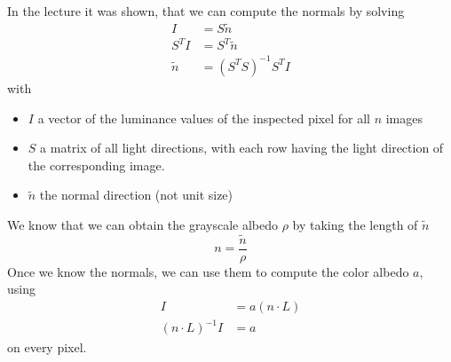 \documentclass{paper}
\begin{document}
In the lecture it was shown, that we can compute the normals by solving
\begin{align*}
	 I &= S\tilde{n} \\
	 S^TI &= S^T\tilde{n} \\
	 \tilde{n} &= (S^TS)^{-1}S^TI
\end{align*}
with 
\begin{itemize}
	\item $I$ a vector of the luminance values of the 
	inspected pixel for all $n$ images
	\item $S$ a matrix of all light directions, with each row
	having the light direction of the corresponding image.
	\item $\tilde{n}$ the normal direction (not unit size)
\end{itemize}
We know that we can obtain the grayscale albedo $\rho$ by taking the length of $\tilde{n}$
\begin{equation}
	n = \frac{\tilde{n}}{\rho}
\end{equation}
Once we know the normals, we can use them to compute the color albedo $a$, using
\begin{align*}
	I &= a(n \cdot L) \\
	(n \cdot L)^{-1} I &= a
\end{align*}
on every pixel.
\end{document}
